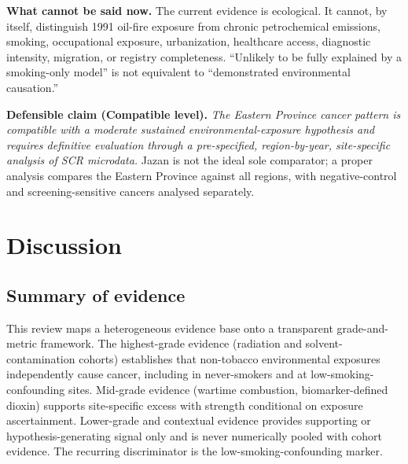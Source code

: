 \documentclass[3p,times]{elsarticle}
\begin{document}
\textbf{What cannot be said now.} The current evidence is ecological. It cannot, by itself, distinguish 1991 oil-fire exposure from chronic petrochemical emissions, smoking, occupational exposure, urbanization, healthcare access, diagnostic intensity, migration, or registry completeness. ``Unlikely to be fully explained by a smoking-only model'' is not equivalent to ``demonstrated environmental causation.''

\textbf{Defensible claim (Compatible level).} \emph{The Eastern Province cancer pattern is compatible with a moderate sustained environmental-exposure hypothesis and requires definitive evaluation through a pre-specified, region-by-year, site-specific analysis of SCR microdata.} Jazan is not the ideal sole comparator; a proper analysis compares the Eastern Province against all regions, with negative-control and screening-sensitive cancers analysed separately.

\section{Discussion}

\subsection{Summary of evidence}
This review maps a heterogeneous evidence base onto a transparent grade-and-metric framework. The highest-grade evidence (radiation and solvent-contamination cohorts) establishes that non-tobacco environmental exposures independently cause cancer, including in never-smokers and at low-smoking-confounding sites. Mid-grade evidence (wartime combustion, biomarker-defined dioxin) supports site-specific excess with strength conditional on exposure ascertainment. Lower-grade and contextual evidence provides supporting or hypothesis-generating signal only and is never numerically pooled with cohort evidence. The recurring discriminator is the low-smoking-confounding marker.
\end{document}
